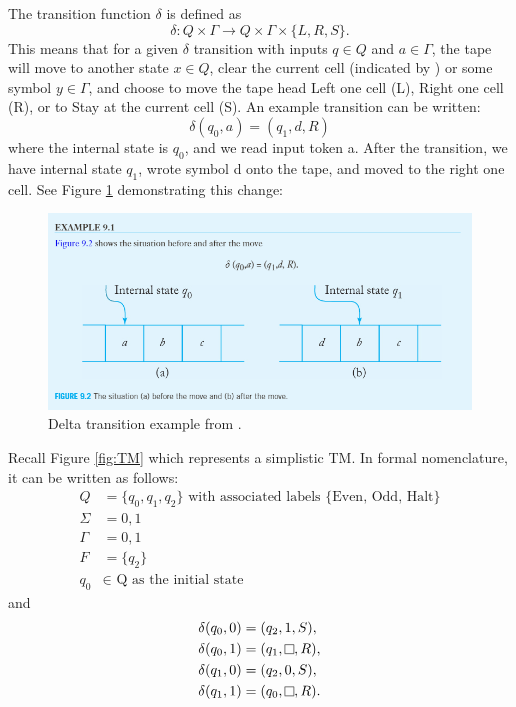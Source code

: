 The transition function $\delta$ is defined as \[\delta: Q \times \Gamma \rightarrow Q \times \Gamma \times \{L, R, S\}.\]
This means that for a given $\delta$ transition with inputs $q \in Q$ and $a \in \Gamma$, the tape will move to another state $x \in Q$, clear the current cell (indicated by \raisebox{0.1cm}{\fbox{}}) or some symbol $y \in \Gamma$, and choose to move the tape head Left one cell (L), Right one cell (R), or to Stay at the current cell (S).
An example transition can be written: \[\delta(q_{0}, a) = (q_{1}, d, R)\] where the internal state is $q_{0}$, and we read input token a.
After the transition, we have internal state $q_{1}$, wrote symbol d onto the tape, and moved to the right one cell.
See Figure \ref{fig:DeltaTransition} demonstrating this change:

\begin{figure}[htb]
    \centering
    \includegraphics[width=16cm]{Images/deltatransition.png}
       \caption{Delta transition example from \cite{IntroFormLangAuto}.}
           \label{fig:DeltaTransition}
\end{figure}

Recall Figure \ref{fig:TM} which represents a simplistic TM.
In formal nomenclature, it can be written as follows:
\[
    \begin{aligned}
        Q &= \{q_{0}, q_{1}, q_{2}\} \text{ with associated labels \{Even, Odd, Halt\}}\\
        \Sigma &= {0,1}\\
        \Gamma &= {0,1}\\
        F &= \{q_{2}\}\\
        q_{0} &\in \text{ Q as the initial state}
    \end{aligned}
\]
and
\[
    \begin{aligned}
        \delta (q_{0}, 0) &= (q_{2}, 1, S),\\
        \delta (q_{0}, 1) &= (q_{1}, \raisebox{0.1cm}{\fbox{}}, R),\\
        \delta (q_{1}, 0) &= (q_{2}, 0, S),\\
        \delta (q_{1}, 1) &= (q_{0}, \raisebox{0.1cm}{\fbox{}}, R).\\
    \end{aligned}
\]

